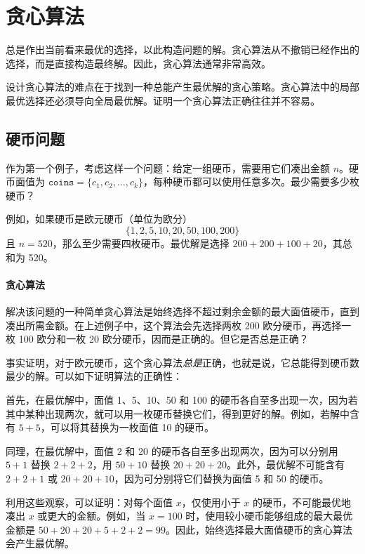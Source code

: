 \chapter{贪心算法}


总是作出当前看来最优的选择，以此构造问题的解。贪心算法从不撤销已经作出的选择，而是直接构造最终解。因此，贪心算法通常非常高效。

设计贪心算法的难点在于找到一种总能产生最优解的贪心策略。贪心算法中的局部最优选择还必须导向全局最优解。证明一个贪心算法正确往往并不容易。

\section{硬币问题}

作为第一个例子，考虑这样一个问题：给定一组硬币，需要用它们凑出金额 $n$。硬币面值为 $\texttt{coins}=\{c_1,c_2,\ldots,c_k\}$，每种硬币都可以使用任意多次。最少需要多少枚硬币？

例如，如果硬币是欧元硬币（单位为欧分）
\[\{1,2,5,10,20,50,100,200\}\]
且 $n=520$，那么至少需要四枚硬币。最优解是选择 $200+200+100+20$，其总和为 520。

\subsubsection{贪心算法}

解决该问题的一种简单贪心算法是始终选择不超过剩余金额的最大面值硬币，直到凑出所需金额。在上述例子中，这个算法会先选择两枚 200 欧分硬币，再选择一枚 100 欧分和一枚 20 欧分硬币，因而是正确的。但它是否总是正确？

事实证明，对于欧元硬币，这个贪心算法\emph{总是}正确，也就是说，它总能得到硬币数最少的解。可以如下证明算法的正确性：

首先，在最优解中，面值 1、5、10、50 和 100 的硬币各自至多出现一次，因为若其中某种出现两次，就可以用一枚硬币替换它们，得到更好的解。例如，若解中含有 $5+5$，可以将其替换为一枚面值 10 的硬币。

同理，在最优解中，面值 2 和 20 的硬币各自至多出现两次，因为可以分别用 $5+1$ 替换 $2+2+2$，用 $50+10$ 替换 $20+20+20$。此外，最优解不可能含有 $2+2+1$ 或 $20+20+10$，因为可分别将它们替换为面值 5 和 50 的硬币。

利用这些观察，可以证明：对每个面值 $x$，仅使用小于 $x$ 的硬币，不可能最优地凑出 $x$ 或更大的金额。例如，当 $x=100$ 时，使用较小硬币能够组成的最大最优金额是 $50+20+20+5+2+2=99$。因此，始终选择最大面值硬币的贪心算法会产生最优解。

